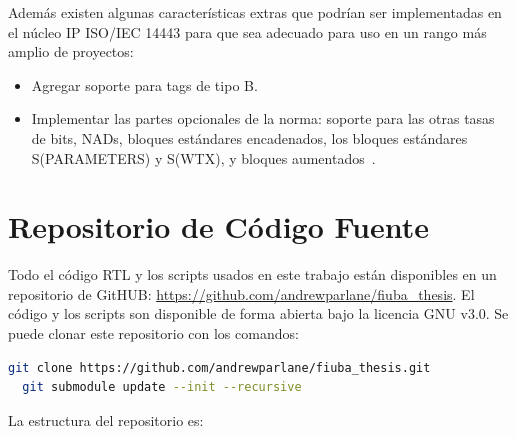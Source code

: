 \documentclass[a4paper, twoside, 11pt]{report}
\begin{document}
Además existen algunas características extras que podrían ser implementadas en el núcleo IP ISO/IEC 14443 para que sea adecuado para uso en un rango más amplio de proyectos:

\begin{itemize}
  \item Agregar soporte para tags de tipo B.
  \item Implementar las partes opcionales de la norma: soporte para las otras tasas de bits, NADs, bloques estándares encadenados, los bloques estándares S(PARAMETERS) y S(WTX), y bloques aumentados~\cite{iso14443-2}\cite{iso14443-4}.
\end{itemize}


\appendix

\titleformat{\chapter}[display]
{\normalfont\Huge\bfseries}{\chaptertitlename\ \thechapter:}{0.2em}{\huge}

\newpage
\chapter{Repositorio de Código Fuente}
\label{appendix:code_repo}

Todo el código RTL y los scripts usados en este trabajo están disponibles en un repositorio de GitHUB: \url{https://github.com/andrewparlane/fiuba_thesis}. El código y los scripts son disponible de forma abierta bajo la licencia GNU v3.0. Se puede clonar este repositorio con los comandos:

\begin{lstlisting}[language=bash,basicstyle=\small\ttfamily]
  git clone https://github.com/andrewparlane/fiuba_thesis.git
  git submodule update --init --recursive
\end{lstlisting}

La estructura del repositorio es:

\vspace{1em}

\end{document}
